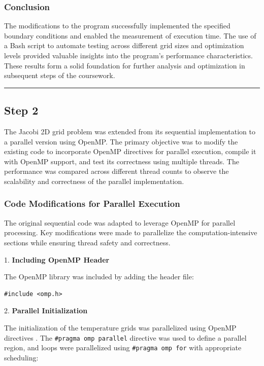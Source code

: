 \documentclass{article}
\begin{document}
\subsubsection{Conclusion}

The modifications to the program successfully implemented the specified boundary conditions and enabled the measurement of execution time. The use of a Bash script to automate testing across different grid sizes and optimization levels provided valuable insights into the program's performance characteristics. These results form a solid foundation for further analysis and optimization in subsequent steps of the coursework.

\rule{\linewidth}{0.5pt}

\subsection{Step 2}

The Jacobi 2D grid problem was extended from its sequential implementation to a parallel version using OpenMP. The primary objective was to modify the existing code to incorporate OpenMP directives for parallel execution, compile it with OpenMP support, and test its correctness using multiple threads. The performance was compared across different thread counts to observe the scalability and correctness of the parallel implementation.

\subsubsection{Code Modifications for Parallel Execution}

The original sequential code was adapted to leverage OpenMP for parallel processing. Key modifications were made to parallelize the computation-intensive sections while ensuring thread safety and correctness.

1. \textbf{Including OpenMP Header}

   The OpenMP library was included by adding the header file:

   \begin{lstlisting}[style=CStyle, caption={OpenMP Header Inclusion}]
   #include <omp.h>
   \end{lstlisting}

2. \textbf{Parallel Initialization}

    The initialization of the temperature grids was parallelized using OpenMP directives \parencite{chapman2007openmp}. The \texttt{\#pragma omp parallel} directive was used to define a parallel region, and loops were parallelized using \texttt{\#pragma omp for} with appropriate scheduling:
\end{document}
